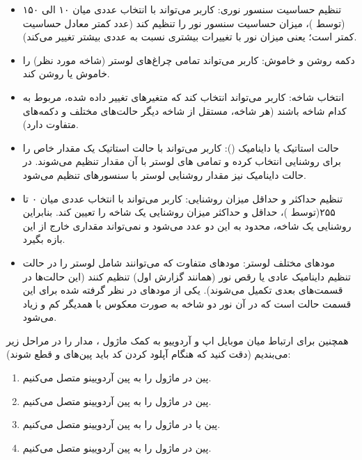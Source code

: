 \documentclass[12pt,a4paper]{article}
\begin{document}
	
	\begin{itemize}
		\item 
		{تنظیم حساسیت سنسور نوری:} کاربر می‌تواند با انتخاب عددی میان ۱۰ الی ۱۵۰ (توسط )، میزان حساسیت سنسور نور را تنظیم کند (عدد کمتر معادل حساسیت کمتر است؛ یعنی میزان نور با تغییرات بیشتری نسبت به عددی بیشتر تغییر می‌کند).
		\item 
		{دکمه روشن و خاموش:} کاربر می‌تواند تمامی چراغ‌های لوستر (شاخه مورد نظر) را خاموش یا روشن کند.
		\item 
		{انتخاب شاخه:} کاربر می‌تواند انتخاب کند که متغیرهای تغییر داده شده، مربوط به کدام شاخه باشند (هر شاخه، مستقل از شاخه دیگر حالت‌های مختلف و دکمه‌های متفاوت دارد).
		\item 
		{حالت استاتیک یا داینامیک ():} کاربر می‌تواند با حالت استاتیک یک مقدار خاص را برای روشنایی انتخاب کرده و تمامی  های لوستر با آن مقدار تنظیم می‌شوند. در حالت داینامیک نیز مقدار روشنایی لوستر با سنسورهای تنظیم می‌شود.
		\item 
		{تنظیم حداکثر و حداقل میزان روشنایی:} کاربر می‌تواند با انتخاب عددی میان ۰ تا ۲۵۵(توسط )، حداقل و حداکثر میزان روشنایی یک شاخه را تعیین کند. بنابراین روشنایی یک شاخه، محدود به این دو عدد می‌شود و نمی‌تواند مقداری خارج از این بازه بگیرد.
		\item 
		{مودهای مختلف لوستر:} مودهای متفاوت که می‌توانند شامل لوستر را در حالت تنظیم داینامیک عادی یا رقص نور (همانند گزارش اول) تنظیم کنند (این حالت‌ها در قسمت‌های بعدی تکمیل می‌شوند). یکی از مودهای در نظر گرفته شده برای این قسمت حالت  است که در آن نور دو شاخه به صورت معکوس با همدیگر کم و زیاد می‌شود.
		
	\end{itemize}
	همچنین برای ارتباط میان موبایل اپ و آردوییو به کمک ماژول ، مدار را در مراحل زیر می‌بندیم (دقت کنید که هنگام آپلود کردن کد باید پین‌های  و  قطع شوند):
	\begin{enumerate}
		\item
		پین  در ماژول  را به پین  آردویینو متصل می‌کنیم.
		\item
		پین  در ماژول  را به پین  آردویینو متصل می‌کنیم.
		\item
		پین  یا  در ماژول  را به پین  آردویینو متصل می‌کنیم.
		\item
		پین  در ماژول  را به پین  آردویینو متصل می‌کنیم.
	\end{enumerate}
	
\end{document}
